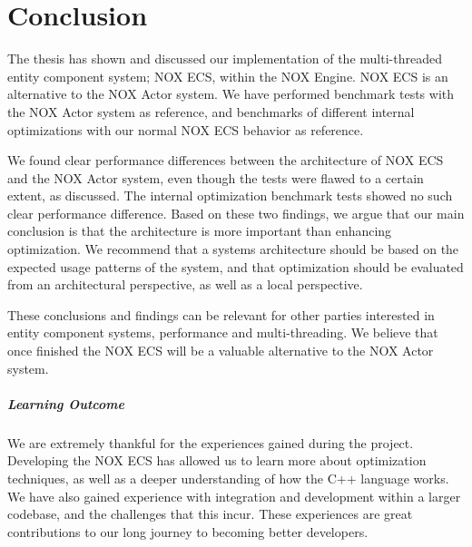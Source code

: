 \chapter{Conclusion}
\label{chap:conclusion}
The thesis has shown and discussed our implementation of the multi-threaded entity
component system; NOX ECS, within the NOX Engine. NOX ECS is an alternative to the NOX Actor system.
We have performed benchmark tests with the NOX Actor system as reference,
and benchmarks of different internal optimizations with our normal NOX ECS behavior as reference.

We found clear performance differences between the architecture of NOX ECS and the NOX Actor system,
even though the tests were flawed to a certain extent, as discussed.
The internal optimization benchmark tests showed no such clear performance difference.
Based on these two findings, we argue that our main conclusion is that the architecture is more important than enhancing optimization.
We recommend that a systems architecture should be based on the expected usage patterns of the system,
and that optimization should be evaluated from an architectural perspective, as well as a local perspective.

These conclusions and findings can be relevant for other parties interested
in entity component systems, performance and multi-threading.
We believe that once finished the NOX ECS will be a valuable alternative to the NOX Actor system.

\paragraph{Learning Outcome}
We are extremely thankful for the experiences gained during the project.
Developing the NOX ECS has allowed us to learn more about optimization techniques,
as well as a deeper understanding of how the C++ language works.
We have also gained experience with integration and development within a larger codebase,
and the challenges that this incur.
These experiences are great contributions to our long journey to becoming better developers.
